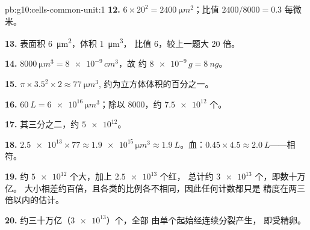 \begin{solution}{pb:g10:cells-common-unit:1}
\textbf{12.} $6 \times 20^2 = \qty{2400}{\micro m^2}$；比值
$2400/8000 = 0.3$ 每微米。

\textbf{13.} 表面积 \qty{6}{\micro m^2}，体积 \qty{1}{\micro m^3}，
比值 6，较上一题大 20 倍。

\textbf{14.} $\qty{8000}{\micro m^3} = \num{8e-9}\,\unit{cm^3}$，故
约 $\num{8e-9}\,\unit{g} = \qty{8}{ng}$。

\textbf{15.} $\pi \times 3.5^2 \times 2 \approx \qty{77}{\micro m^3}$,
约为立方体体积的百分之一。

\textbf{16.} $\qty{60}{L} = \num{6e16}\,\unit{\micro m^3}$；除以
8000，约 $\num{7.5e12}$ 个。

\textbf{17.} 其三分之二，约 $\num{5e12}$。

\textbf{18.} $\num{2.5e13} \times 77 \approx \num{1.9e15}\,\unit{\micro
m^3} \approx \qty{1.9}{L}$。血：$0.45 \times 4.5 \approx
\qty{2.0}{L}$——相符。

\textbf{19.} 约 $\num{5e12}$ 个大，加上 $\num{2.5e13}$ 个红，
总计约 $\num{3e13}$ 个，即数十万亿。
大小相差约百倍，且各类的比例各不相同，因此任何计数都只是
精度在两三倍以内的估计。

\textbf{20.} 约三十万亿（$\num{3e13}$）个，全部
由单个起始经连续分裂产生，
即受精卵。
\end{solution}
